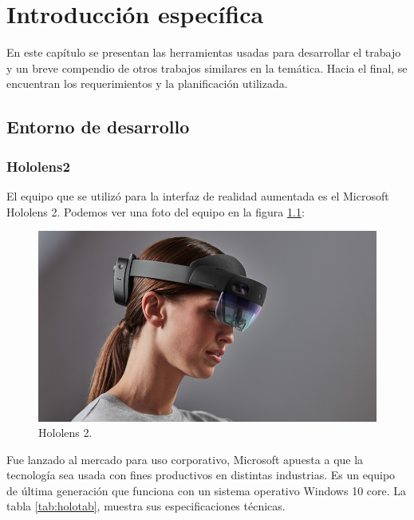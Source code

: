 \chapter{Introducción específica} %

\label{Chapter2}

En este capítulo se presentan las herramientas usadas para desarrollar el trabajo y un breve compendio de otros trabajos similares en la temática. Hacia el final, se encuentran los requerimientos y la planificación utilizada.

\section{Entorno de desarrollo}
\subsection{Hololens2}

El equipo que se utilizó para la interfaz de realidad aumentada es el Microsoft Hololens 2. Podemos ver una foto del equipo en la figura \ref{fig:hololens2}:

\begin{figure}[htpb]
	\centering
	\includegraphics[scale=.5]{./Figures/hololens2.jpeg}
	\caption{Hololens 2\protect\footnotemark.}
	\label{fig:hololens2}
\end{figure}



Fue lanzado al mercado para uso corporativo, Microsoft apuesta a que la tecnología sea usada con fines productivos en distintas industrias. Es un equipo de última generación que funciona con un sistema operativo Windows 10 core.  La tabla \ref{tab:holotab}, muestra sus especificaciones técnicas.

